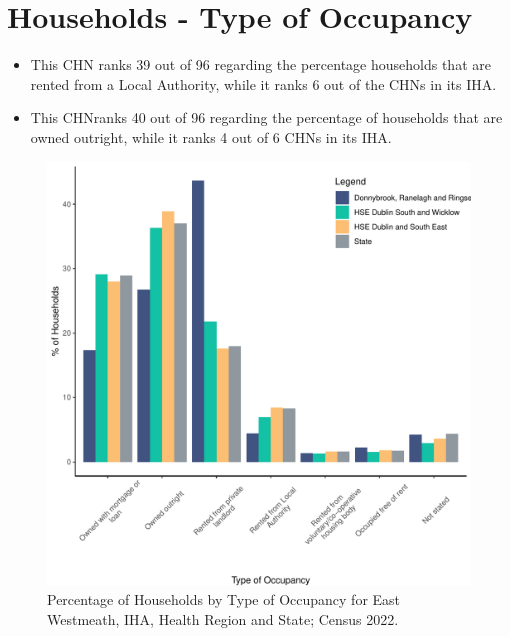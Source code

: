 \documentclass{article}
\begin{document}
\section{Households - Type of Occupancy}\label{sect:Households}
\begin{itemize}
\item This CHN ranks  39 out of 96 regarding the percentage households that are rented from a Local Authority, while it ranks  6 out of the CHNs in its IHA. 
\item This CHNranks  40 out of 96 regarding the percentage of households that are owned outright, while it ranks   4 out of 6 CHNs in its IHA.
\end{itemize}
\begin{figure}[H]
	\centering
	\includegraphics[width = 140mm]{../figures/HouseholdsED.pdf}
	\caption{Percentage of Households by Type of Occupancy for East Westmeath, IHA, Health Region and State; Census 2022.}
	\label{fig:vbnv}
	\end{figure}
\end{document}
